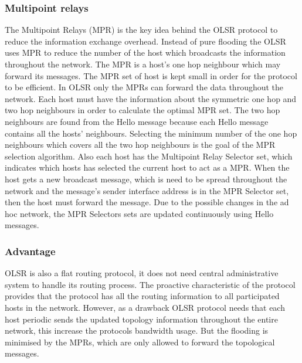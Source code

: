 \documentclass[a4paper]{article}
\begin{document}
\subsubsection{Multipoint relays}
The Multipoint Relays (MPR) is the key idea behind the OLSR protocol to reduce the information exchange overhead. Instead of pure flooding the OLSR uses MPR to reduce the number of the host which broadcasts the information throughout the network. The MPR is a host’s one hop neighbour which may forward its messages. The MPR set of host is kept small in order for the protocol to
be efficient. In OLSR only the MPRs can forward the data throughout the network. Each host must have the information about the symmetric one hop and two hop neighbours in order to calculate the
optimal MPR set. The two hop neighbours are found from the Hello message because each Hello message contains all the hosts’ neighbours. Selecting the minimum number of the one hop neighbours which covers all the two hop neighbours is the goal of the MPR selection algorithm.
Also each host has the Multipoint Relay Selector set, which indicates which hosts has selected the current host to act as a MPR. When the host gets a new broadcast message, which is need to be spread throughout the network and the message’s sender interface address is in the MPR Selector set, then the host must forward the message. Due to the possible changes in the ad hoc network, the MPR Selectors sets are updated continuously using Hello messages.

\subsubsection{Advantage}
OLSR is also a flat routing protocol, it does not need central administrative system to handle its routing process. The proactive characteristic of the protocol provides that the protocol has all the routing information to all participated hosts in the network. However, as a drawback OLSR
protocol needs that each host periodic sends the updated topology information throughout the entire network, this increase the protocols bandwidth usage. But the flooding is minimised by the MPRs, which are only allowed to forward the topological messages.
\end{document}

